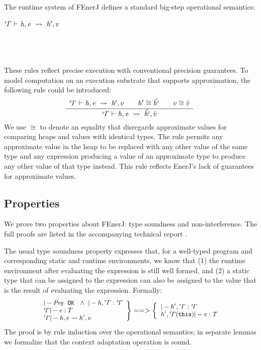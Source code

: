 The runtime system of FEnerJ defines a standard big-step operational
semantics:

\vspace{0.5ex}
\noindent
\begin{ottdefnblock}[#1]{$ \mathit{ {^r}\!\Gamma} \  \textsf{$\vdash$} \  \mathit{h} ,  \mathit{e} \ \leadsto\  \mathit{h'} ,  v $}{}
\ottusedrule{\ottdruleosXXread{}}\\[1mm plus 1mm minus .5mm]
\ottusedrule{\ottdruleosXXwrite{}}\\[1mm plus 1mm minus .5mm]
\ottusedrule{\ottdruleosXXcondXXt{}}\\[1mm plus 1mm minus .5mm]
\ottusedrule{\ottdruleosXXcondXXf{}}\\
\end{ottdefnblock}

\noindent
These rules reflect precise execution with conventional precision
guarantees.
To model computation on an execution substrate that supports approximation,
the following rule could be introduced:
%
\[
\ottdruleosXXapprox{}
\]
%
We use $\cong$ to denote an equality that disregards approximate
values for comparing heaps and values with identical types.
The rule permits any
approximate value in the heap to be replaced with any other value
of the same type
and any expression producing a value of an approximate type to
produce any other value of that type instead.
This rule reflects EnerJ's
lack of guarantees for approximate values.



\subsection{Properties}

We prove two properties about FEnerJ: type soundness and
non-interference. The full proofs are listed in the accompanying
technical report \cite{EnerJ-TR}.

The usual type soundness property expresses that, for a well-typed
program and corresponding static and runtime environments, we know
that
(1) the runtime environment after evaluating the expression is still
well formed, and
(2) a static type that can be assigned to the expression can also be
assigned to the value that is the result of evaluating the expression.
Formally:
\[
\small
\left.
\begin{array}{l}
|- \mathit{Prg}\ \ \mathtt{OK}\ \ \wedge\  |- h, \mathit{^{r}\!\Gamma} : \mathit{^{s}\!\Gamma}\\
\mathit{^{s}\!\Gamma} |- e : T\\
\mathit{^{r}\!\Gamma} |- h, e \leadsto h', v\\
\end{array}
\right\} ==> \left\{
\begin{array}{l}
|- h', \mathit{^{r}\!\Gamma} : \mathit{^{s}\!\Gamma}\\
h', \mathit{^{r}\!\Gamma}(\mathtt{this}) |- v : T\\
\end{array}
\right.
\]
The proof is by rule induction over the operational semantics; in
separate lemmas we formalize that the context adaptation operation
\comb{} is sound.


